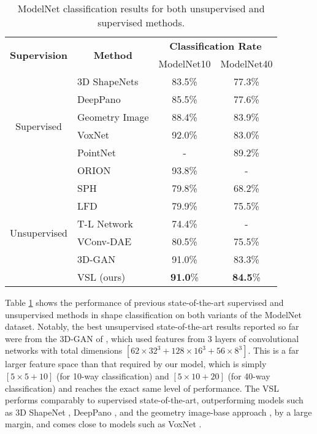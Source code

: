 \documentclass[10pt,twocolumn,letterpaper]{article}
\begin{document}
\begin{table}[ht!]
 \vspace{-0.5em}
  \centering
  \small
  \setlength\tabcolsep{2pt}
    \begin{tabular}{clcc}
    \multirow{2}[0]{*}{{\bf Supervision}} & \multicolumn{1}{c}{\multirow{2}[0]{*}{{\bf Method}}} & \multicolumn{2}{c}{{\bf Classification Rate}} \\
          &       & ModelNet10 & ModelNet40 \\
    \toprule
    \multirow{6}[0]{*}{Supervised} & 3D ShapeNets \cite{wu20153d}  & 83.5\% & 77.3\% \\
          & DeepPano \cite{shi2015deeppano} & 85.5\% &  77.6\% \\
          & Geometry Image \cite{sinha2016deep} & 88.4\% & 83.9\% \\
          & VoxNet \cite{maturana2015voxnet}& 92.0\%  & 83.0\%   \\
          & PointNet \cite{qi2016pointnet} & - & 89.2\% \\
          & ORION \cite{sedaghat2016orientation} &   93.8\%     &  - \\
    \midrule
    \multirow{6}[0]{*}{Unsupervised} & SPH \cite{kazhdan2003rotation}  &  79.8\%  & 68.2\% \\
          & LFD \cite{chen2003visual}  &   79.9\%    & 75.5\% \\          & T-L Network \cite{girdhar2016learning}&   74.4\%  & - \\
          & VConv-DAE \cite{sharma2016vconv} & 80.5\%  &    75.5\%   \\
          & 3D-GAN \cite{wu2016learning}&  91.0\% & 83.3\% \\
          & VSL (ours) &  {\bf 91.0}\%   & {\bf 84.5}\%\\
    \bottomrule
    \end{tabular}\caption{ModelNet classification results for both unsupervised and supervised methods.}
  \label{tab:shapeclass}\vspace{-0.5em}
\end{table}

Table \ref{tab:shapeclass} shows the performance of previous state-of-the-art supervised and unsupervised methods in shape classification on both variants of the ModelNet dataset. Notably, the best unsupervised state-of-the-art results reported so far were from the 3D-GAN of \cite{wu2016learning}, which used features from 3 layers of convolutional networks with total dimensions $[62\times 32^3 + 128\times 16^3 + 56\times 8^3]$. This is a far larger feature space than that required by our model, which is simply $[5\times 5 + 10]$ (for 10-way classification) and $[5\times 10 +20]$ (for 40-way classification) and reaches the exact same level of performance. The VSL performs comparably to supervised state-of-the-art, outperforming models such as 3D ShapeNet \cite{wu20153d}, DeepPano \cite{shi2015deeppano}, and the geometry image-base approach \cite{sinha2016deep}, by a large margin, and comes close to models such as VoxNet \cite{maturana2015voxnet}.
\end{document}
